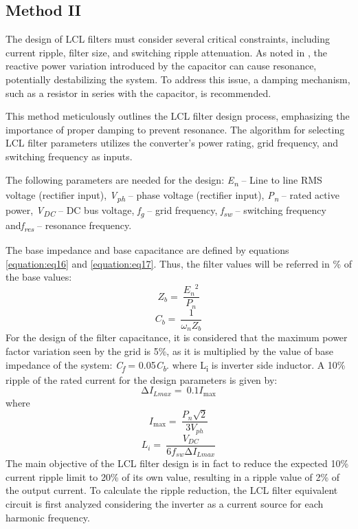 \documentclass[12pt,a4paper]{book}
\begin{document}
\subsection{Method II}
The design of LCL filters must consider several critical constraints, including current ripple, filter size, and switching ripple attenuation. As noted in \cite{lcl2012}, the reactive power variation introduced by the capacitor can cause resonance, potentially destabilizing the system. To address this issue, a damping mechanism, such as a resistor in series with the capacitor, is recommended.

This method meticulously outlines the LCL filter design process, emphasizing the importance of proper damping to prevent resonance. The algorithm for selecting LCL filter parameters utilizes the converter's power rating, grid frequency, and switching frequency as inputs.

The following parameters are needed for the design: \emph{E\textsubscript{n}} -- Line to line RMS voltage (rectifier input), \emph{V\textsubscript{ph}} -- phase voltage (rectifier input), \emph{P\textsubscript{n}} -- rated active power, \emph{V\textsubscript{DC}} -- DC bus voltage, \emph{f\textsubscript{g}} -- grid frequency, \emph{f\textsubscript{sw}} -- switching frequency and\emph{f\textsubscript{res}} -- resonance frequency.

The base impedance and base capacitance are defined by equations \ref{equation:eq16} and \ref{equation:eq17}. Thus, the filter values will be referred in \% of the base values:
\begin{equation}
  Z_{b} = \ \frac{{E_{n}}^{2}}{P_{n}}
  \label{equation:eq16}
\end{equation}
\begin{equation}
  C_{b} = \ \frac{1}{\omega_{n}Z_{b}}
  \label{equation:eq17}
\end{equation}
For the design of the filter capacitance, it is considered that the maximum power factor variation seen by the grid is 5\%, as it is multiplied by the value of base impedance of the system: \emph{C\textsubscript{f}} = 0.05\emph{C\textsubscript{b}}. where L\textsubscript{i} is inverter side inductor. A 10\% ripple of the rated current for the design parameters is given by:
\begin{equation}
  {\mathrm{\Delta}I}_{Lmax} = \ 0.1I_{\max}
  \label{equation:eq18}
\end{equation}
where
\begin{equation}
  I_{\max} = \ \frac{P_{n}\sqrt{2}}{{3V}_{ph}}
  \label{equation:eq19}
\end{equation}
\begin{equation}
  L_{i} = \ \frac{V_{DC}}{6f_{sw}{\mathrm{\Delta}I}_{Lmax}}
  \label{equation:eq20}
\end{equation}
The main objective of the LCL filter design is in fact to reduce the expected 10\% current ripple limit to 20\% of its own value, resulting in a ripple value of 2\% of the output current. To calculate the ripple reduction, the LCL filter equivalent circuit is first analyzed considering the inverter as a current source for each harmonic frequency.
\end{document}
